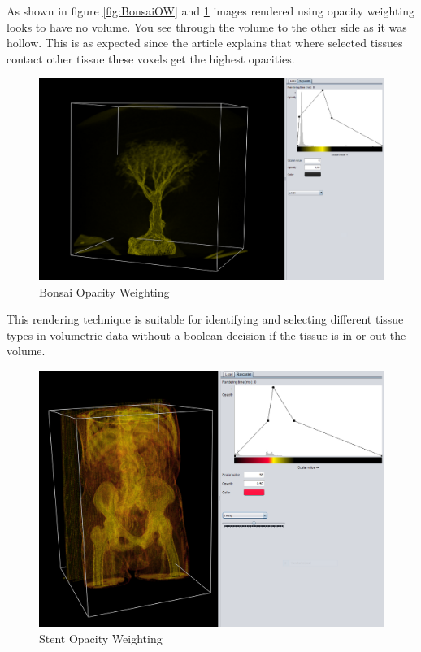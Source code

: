 \documentclass[a4paper,twoside,11pt]{article}
\begin{document}
As shown in figure \ref{fig:BonsaiOW} and \ref{fig:OrangeOW} images rendered using opacity weighting looks to have no volume. You see through the volume to the other side as it was hollow. This is as expected since the article explains that where selected tissues contact other tissue these voxels get the highest opacities.

\begin{figure}[h!]
    \includegraphics[width=\textwidth]{Images/BonsaiOW.png}
    \caption{Bonsai Opacity Weighting}
    \label{fig:OrangeOW}
\end{figure}
This rendering technique is suitable for identifying and selecting different tissue types in volumetric data without a boolean decision if the tissue is in or out the volume.
\begin{figure}[h!]
    \includegraphics[width=\textwidth]{Images/StentOW.png}
    \caption{Stent Opacity Weighting}
    \label{fig:StentOW}
\end{figure}
\end{document}
